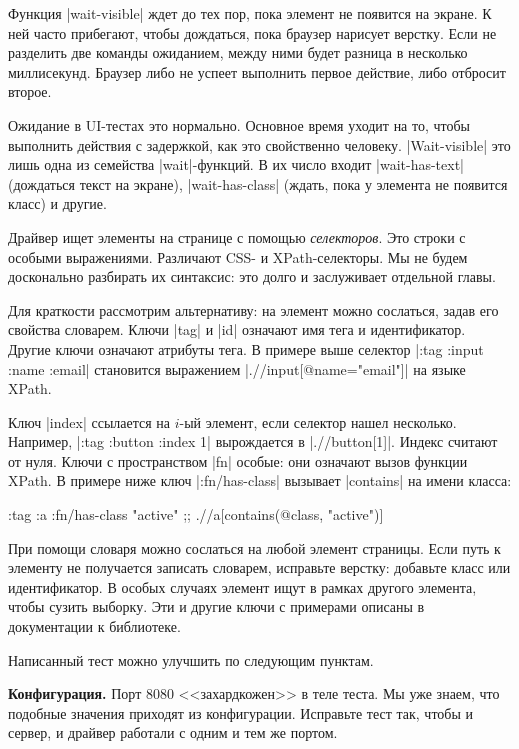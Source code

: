 Функция \spverb|wait-visible| ждет до тех пор, пока элемент не появится на
экране. К ней часто прибегают, чтобы дождаться, пока браузер нарисует
верстку. Если не разделить две команды ожиданием, между ними будет разница в
несколько миллисекунд. Браузер либо не успеет выполнить первое действие, либо
отбросит второе.

Ожидание в UI-тестах это нормально. Основное время уходит на то, чтобы выполнить
действия с задержкой, как это свойственно человеку. \spverb|Wait-visible| это
лишь одна из семейства \spverb|wait|-функций. В их число входит
\spverb|wait-has-text| (дождаться текст на экране), \spverb|wait-has-class|
(ждать, пока у элемента не появится класс) и другие.

Драйвер ищет элементы на странице с помощью \emph{селекторов}. Это строки с
особыми выражениями. Различают CSS- и XPath-селекторы. Мы не будем досконально
разбирать их синтаксис: это долго и заслуживает отдельной главы.

Для краткости рассмотрим альтернативу: на элемент можно сослаться, задав его
свойства словарем. Ключи \spverb|tag| и \spverb|id| означают имя тега и
идентификатор. Другие ключи означают атрибуты тега. В примере выше селектор
\spverb|{:tag :input :name :email}| становится выражением
\spverb|.//input[@name="email"]| на языке XPath.

Ключ \spverb|index| ссылается на $i$-ый элемент, если селектор нашел
несколько. Например, \spverb|{:tag :button :index 1}| вырождается в
\spverb|.//button[1]|. Индекс считают от нуля. Ключи с пространством \spverb|fn|
особые: они означают вызов функции XPath. В примере ниже ключ
\spverb|:fn/has-class| вызывает \spverb|contains| на имени класса:

\begin{english}
  \begin{clojure}
{:tag :a :fn/has-class "active"}
;; .//a[contains(@class, "active")]
  \end{clojure}
\end{english}

При помощи словаря можно сослаться на любой элемент страницы. Если путь к
элементу не получается записать словарем, исправьте верстку: добавьте класс или
идентификатор. В особых случаях элемент ищут в рамках другого элемента, чтобы
сузить выборку. Эти и другие ключи с примерами описаны в документации к
библиотеке.

Написанный тест можно улучшить по следующим пунктам.

\textbf{Конфигурация.} Порт 8080 <<захардкожен>> в теле теста. Мы уже знаем, что
подобные значения приходят из конфигурации. Исправьте тест так, чтобы и сервер,
и драйвер работали с одним и тем же портом.

